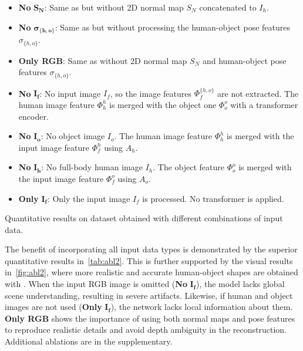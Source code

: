 \begin{itemize}[topsep=0pt,partopsep=0pt,itemsep=0pt,parsep=0pt] 
    \item\textbf{No} $\mathbf{S_N}$: Same  as \name but without  2D normal map $S_N$ concatenated to $I_h$.    
    \item\textbf{No} $\boldsymbol{\sigma_{\{h,o\}}}$:  Same as \name but without  processing the human-object pose features $\sigma_{\{h,o\}}$.
    \item\textbf{Only RGB}: Same as \name without 2D normal map $S_N$ and human-object pose features $\sigma_{\{h,o\}}$.
    \item\textbf{No} $\mathbf{I_f}$: No input image $I_f$, so the image features $\Phi_f^{\{h,o\}}$  are not extracted. The human image feature $\Phi_h^{h}$ is merged with the object one $\Phi_o^{o}$ with a transformer encoder.
    \item\textbf{No} $\mathbf{I_o}$: No object image $I_o$. The human image feature $\Phi_h^{h}$ is merged with the input image feature $\Phi_f^{h}$ using $A_h$.
    \item\textbf{No} $\mathbf{I_h}$: No full-body human image $I_h$. The object feature $\Phi_o^{o}$ is merged with the input image feature $\Phi_f^{o}$ using $A_o$.
    \item\textbf{Only} $\mathbf{I_f}$: Only the input image $I_f$ is processed. No transformer is applied.
\end{itemize}
\begin{table}[t]
\centering
\resizebox{\linewidth}{!}
{}
\vspace{-3.5mm}
\caption{Quantitative results on \dataname dataset  obtained with different combinations of input data.}
\vspace{-6mm}
\label{tab:abl2}
\end{table}
The benefit of incorporating all input data types is demonstrated by the superior quantitative results in~\cref{tab:abl2}. This is further supported by the visual results in~\cref{fig:abl2}, where more realistic and accurate human-object shapes are obtained with \name. When the input RGB image is omitted (\textbf{No } $\mathbf{I_f}$), the model lacks global scene understanding, resulting in severe artifacts. Likewise, if human and object images are not used (\textbf{Only}  $\mathbf{I_f}$), the network lacks local information about them. \textbf{Only RGB} shows the importance of using both normal maps and pose features to reproduce realistic details and avoid depth ambiguity in the reconstruction. Additional ablations are in the supplementary. 

